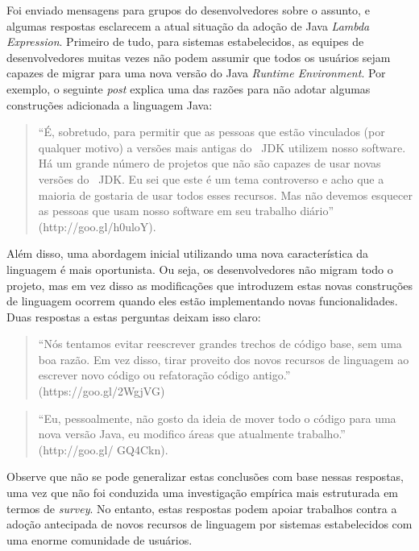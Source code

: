 Foi enviado mensagens para grupos do desenvolvedores sobre o assunto, e algumas respostas esclarecem a atual situação da adoção de Java\textit{ Lambda Expression}. Primeiro de tudo, para sistemas estabelecidos, as equipes de desenvolvedores muitas vezes não podem assumir que todos os usu\'{a}rios sejam capazes de migrar para uma nova versão do Java\textit{ Runtime Environment}. Por exemplo, o seguinte \textit{post} explica uma das razões para não adotar algumas construções adicionada a linguagem Java: 

\begin{quotation}
``É, sobretudo, para permitir que as pessoas que estão vinculados (por qualquer motivo) a versões mais antigas do ~\acs{JDK} utilizem nosso software. Há um grande número de projetos que não são capazes de usar novas versões do ~\acs{JDK}. Eu sei que este é um tema controverso e acho que a maioria de gostaria de usar todos esses recursos. Mas não devemos esquecer as pessoas que usam 
nosso software em seu trabalho diário'' (http://goo.gl/h0uloY).
\end{quotation}

Além disso, uma abordagem inicial utilizando uma nova característica da linguagem é mais oportunista. Ou seja, os desenvolvedores não migram todo o projeto, mas em vez disso as modificações que introduzem estas novas construções de linguagem ocorrem quando eles estão implementando novas funcionalidades. Duas respostas a estas perguntas deixam isso claro: 

\begin{quotation}
``Nós tentamos evitar reescrever grandes trechos de código base, sem uma boa razão. Em vez disso, tirar proveito dos novos recursos de linguagem ao escrever novo código ou refatoração código antigo.'' (https://goo.gl/2WgjVG) 
\end{quotation}

\begin{quotation}
 ``Eu, pessoalmente, não gosto da ideia de mover todo o código para uma nova versão Java, eu modifico áreas que atualmente trabalho.''  (http://goo.gl/ GQ4Ckn).
\end{quotation}

 Observe que não se pode generalizar estas conclusões com base nessas respostas, uma vez que não foi 
conduzida uma investiga\c c\~{a}o emp\'{i}rica mais estruturada em termos de 
\emph{survey}. No entanto, estas respostas podem apoiar trabalhos contra a adoção antecipada de novos recursos de linguagem por sistemas estabelecidos com uma enorme comunidade de usuários.

